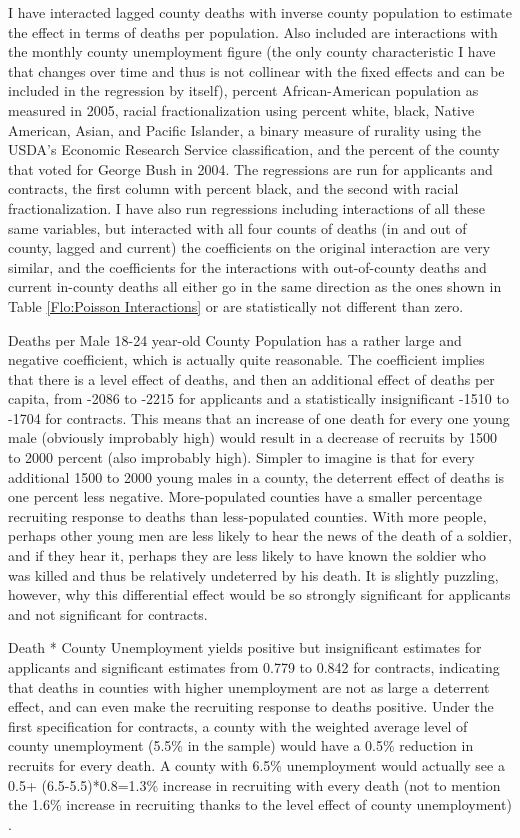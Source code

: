 \documentclass[12pt] {article}
\begin{document}
I have interacted lagged county deaths with inverse county population to estimate the effect in terms of deaths per population. Also included are interactions with the monthly
county unemployment figure (the only county characteristic I have
that changes over time and thus is not collinear with the fixed effects
and can be included in the regression by itself), percent African-American
population as measured in 2005, racial fractionalization using percent
white, black, Native American, Asian, and Pacific Islander, a binary
measure of rurality using the USDA's Economic Research Service classification,
and the percent of the county that voted for George Bush in 2004.
The regressions are run for applicants and contracts, the first column
with percent black, and the second with racial fractionalization.
I have also run regressions including interactions of all these same
variables, but interacted with all four counts of deaths (in and out
of county, lagged and current) the coefficients on the original interaction
are very similar, and the coefficients for the interactions with out-of-county
deaths and current in-county deaths all either go in the same direction
as the ones shown in Table \ref{Flo:Poisson Interactions} or are
statistically not different than zero. 

Deaths per Male 18-24 year-old County Population has a rather large
and negative coefficient, which is actually quite reasonable. The coefficient implies that there is a level effect of deaths, and then an additional effect of deaths per
capita, from -2086 to -2215 for applicants and a statistically insignificant
-1510 to -1704 for contracts. This means that an increase of one death
for every one young male (obviously improbably high) would result
in a decrease of recruits by 1500 to 2000 percent (also improbably
high). Simpler to imagine is that for every additional 1500 to 2000
young males in a county, the deterrent effect of deaths is one percent
less negative. More-populated counties have a smaller percentage
recruiting response to deaths than less-populated counties. With more
people, perhaps other young men are less likely to hear the news of
the death of a soldier, and if they hear it, perhaps they are less
likely to have known the soldier who was killed and thus be relatively
undeterred by his death. It is slightly puzzling, however, why this
differential effect would be so strongly significant for applicants
and not significant for contracts. 

Death {*} County Unemployment yields positive but insignificant estimates
for applicants and significant estimates from 0.779 to 0.842 for contracts,
indicating that deaths in counties with higher unemployment are not
as large a deterrent effect, and can even make the recruiting response
to deaths positive. Under the first specification for contracts, a
county with the weighted average level of county unemployment (5.5\%
in the sample) would have a 0.5\% reduction in recruits for every
death. A county with 6.5\% unemployment would actually see a 0.5+ (6.5-5.5)*0.8=1.3\%
increase in recruiting with every death (not to mention the 1.6\%
increase in recruiting thanks to the level effect of county unemployment) . 
\end{document}
